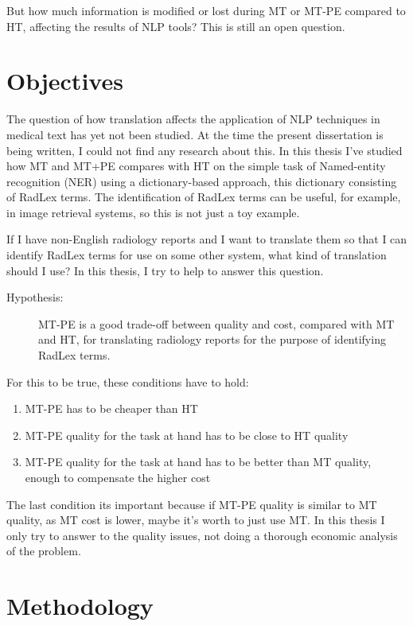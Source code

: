 But how much information is modified or lost during MT or MT-PE compared to HT, affecting the results of NLP tools? This is still an open question. 

\section{Objectives}

The question of how translation affects the application of NLP techniques in medical text has yet not been studied. At the time the present dissertation is being written, I could not find any research about this. In this thesis I've studied how MT and MT+PE compares with HT on the simple task of Named-entity recognition (NER) using a dictionary-based approach, this dictionary consisting of RadLex terms. The identification of RadLex terms can be useful, for example, in image retrieval \citep{Gerstmair2012} systems, so this is not just a toy example. 

If I have non-English radiology reports and I want to translate them so that I can identify RadLex terms for use on some other system, what kind of translation should I use? In this thesis, I try to help to answer this question. 

\newcommand{\hypothesis}{
\begin{description}
	\item[Hypothesis:] MT-PE is a good trade-off between quality and cost, compared with MT and HT, for translating radiology reports for the purpose of identifying RadLex terms. 
\end{description}
}
\hypothesis

For this to be true, these conditions have to hold:

\begin{enumerate}
	\item MT-PE has to be cheaper than HT
	\item MT-PE quality for the task at hand has to be close to HT quality
	\item MT-PE quality for the task at hand has to be better than MT quality, enough to compensate the higher cost
\end{enumerate}

The last condition its important because if MT-PE quality is similar to MT quality, as MT cost is lower, maybe it's worth to just use MT. In this thesis I only try to answer to the quality issues, not doing a thorough economic analysis of the problem. 

\section{Methodology}

